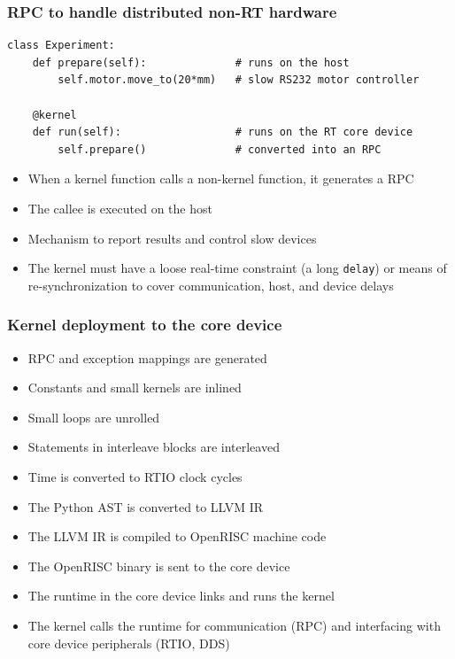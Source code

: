 \documentclass[final,presentation,compress]{beamer}
\begin{document}
\begin{frame}[fragile]
  \frametitle{RPC to handle distributed non-RT hardware}
  \footnotesize

  \begin{verbatim}
class Experiment:
    def prepare(self):              # runs on the host
        self.motor.move_to(20*mm)   # slow RS232 motor controller

    @kernel
    def run(self):                  # runs on the RT core device
        self.prepare()              # converted into an RPC
  \end{verbatim}

  \begin{itemize}
    \item When a kernel function calls a non-kernel function, it generates a RPC
    \item The callee is executed on the host
    \item Mechanism to report results and control slow devices
    \item The kernel must have a loose real-time constraint (a long \verb!delay!)
        or means of re-synchronization to cover communication, host, and device delays
  \end{itemize}
\end{frame}


\begin{frame}
  \frametitle{Kernel deployment to the core device}
  \footnotesize
  \begin{itemize}
    \item RPC and exception mappings are generated
    \item Constants and small kernels are inlined
    \item Small loops are unrolled
    \item Statements in interleave blocks are interleaved
    \item Time is converted to RTIO clock cycles
    \item The Python AST is converted to LLVM IR
    \item The LLVM IR is compiled to OpenRISC machine code
    \item The OpenRISC binary is sent to the core device
    \item The runtime in the core device links and runs the kernel
    \item The kernel calls the runtime for communication (RPC) and interfacing
      with core device peripherals (RTIO, DDS)
  \end{itemize}
\end{frame}
\end{document}
